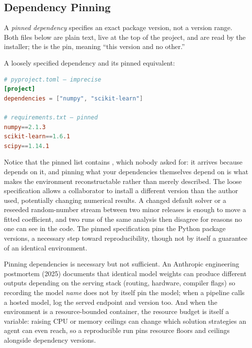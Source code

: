 \subsection{Dependency Pinning}

A \emph{pinned dependency} specifies an exact package version, not a version range.
Both files below are plain text, live at the top of the project, and are read by the installer; the \code{==} is the pin, meaning ``this version and no other.''

\begin{example}
A loosely specified dependency and its pinned equivalent:
\begin{lstlisting}[language=toml]
# pyproject.toml — imprecise
[project]
dependencies = ["numpy", "scikit-learn"]

# requirements.txt — pinned
numpy==2.1.3
scikit-learn==1.6.1
scipy==1.14.1
\end{lstlisting}
Notice that the pinned list contains , which nobody asked for: it arrives because  depends on it, and pinning what your dependencies themselves depend on is what makes the environment reconstructable rather than merely described.
The loose specification allows a collaborator to install a different version than the author used, potentially changing numerical results.
A changed default solver or a reseeded random-number stream between two minor releases is enough to move a fitted coefficient, and two runs of the same analysis then disagree for reasons no one can see in the code.
The pinned specification pins the Python package versions, a necessary step toward reproducibility, though not by itself a guarantee of an identical environment.
\end{example}

\begin{remark}
Pinning dependencies is necessary but not sufficient.
An Anthropic engineering postmortem (2025) documents that identical model weights can produce different outputs depending on the serving stack (routing, hardware, compiler flags) so recording the model \emph{name} does not by itself pin the model; when a pipeline calls a hosted model, log the served endpoint and version too.
And when the environment is a resource-bounded container, the resource budget is itself a variable: raising CPU or memory ceilings can change which solution strategies an agent can even reach, so a reproducible run pins resource floors and ceilings alongside dependency versions.
\end{remark}

